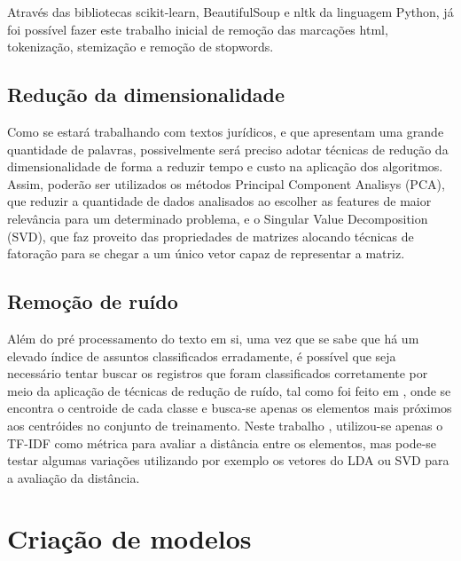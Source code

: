 Através das bibliotecas scikit-learn, BeautifulSoup e nltk da linguagem Python, já foi possível fazer este trabalho inicial de remoção das marcações html, tokenização, stemização e remoção de stopwords.


\subsection{Redução da dimensionalidade}%

Como se estará trabalhando com textos jurídicos, e que apresentam uma grande quantidade de palavras, possivelmente será preciso adotar técnicas de redução da dimensionalidade de forma a reduzir tempo e custo na aplicação dos algoritmos. Assim, poderão ser utilizados os métodos Principal Component Analisys (PCA), que reduzir a quantidade de dados analisados ao escolher as features de maior relevância para um determinado problema, e o Singular Value Decomposition (SVD), que faz proveito das propriedades de matrizes alocando técnicas de fatoração para se chegar a um único vetor capaz de representar a matriz.


\subsection{Remoção de ruído}%

Além do pré processamento do texto em si, uma vez que se sabe que há um elevado índice de assuntos classificados erradamente, é possível que seja necessário tentar buscar os registros que foram classificados corretamente por meio da aplicação de técnicas de redução de ruído, tal como foi feito em \cite{tripadivisor}, onde se encontra o centroide de cada classe e busca-se apenas os elementos mais próximos aos centróides no conjunto de treinamento. Neste trabalho \cite{tripadivisor} , utilizou-se apenas o TF-IDF como métrica para avaliar a distância entre os elementos, mas pode-se testar algumas variações utilizando por exemplo os vetores do LDA ou SVD para a avaliação da distância. 




\section{Criação de modelos}%

